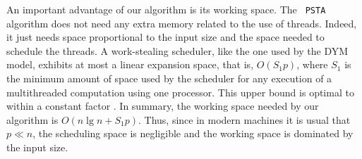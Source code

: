 An important advantage of our algorithm is its working space. The {\tt
PSTA} algorithm does not need any extra memory related to the use of
threads. Indeed, it just needs space proportional to the input size
and the space needed to schedule the threads. A work-stealing
scheduler, like the one used by the DYM model, exhibits at most a
linear expansion space, that is, $O(S_1p)$, where $S_1$ is the minimum
amount of space used by the scheduler for any execution of a
multithreaded computation using one processor. This upper bound is
optimal to within a constant factor
\cite{Blumofe:1999:SMC:324133.324234}. In summary, the working space
needed by our algorithm is $O(n\lg n+S_1p)$. Thus, since in modern
machines it is usual that $p\ll n$, the scheduling space is negligible
and the working space is dominated by the input size.

